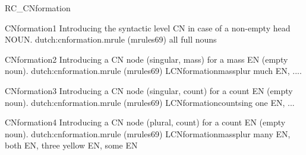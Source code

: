 \begin{mruleclass}{RC\_CNformation}
\begin{classdescr}
\nofilters

\nospeedrules

\noplannedrules

\norulesnotince


\end{classdescr}

\begin{members}
\begin{member}
 CNformation1
 Introducing the syntactic level CN in case of a non-empty head NOUN.
\file dutch:cnformation.mrule (mrules69)
\semantics \nosemantics
\example all full nouns
\remarks\mbox{}
\end{member}
\begin{member}
 CNformation2
Introducing a CN node (singular, mass) for a mass EN (empty noun).
\file dutch:cnformation.mrule (mrules69)
\semantics LCNformationmassplur
\example much EN, ....
\remarks\mbox{}
\end{member}
\begin{member}
 CNformation3
 Introducing a CN node (singular, count) for a count EN (empty noun).
\file dutch:cnformation.mrule (mrules69)
\semantics LCNformationcountsing
\example one EN, ...
\end{member}
\begin{member}
 CNformation4
 Introducing a CN node (plural, count) for a count EN (empty noun).
\file dutch:cnformation.mrule (mrules69)
\semantics LCNformationmassplur
\example many EN, both EN, three yellow EN, some EN

\end{member}
\end{members}
\end{mruleclass}
